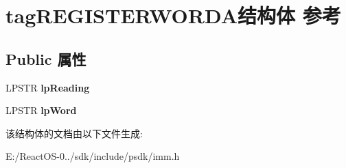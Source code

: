 \hypertarget{structtag_r_e_g_i_s_t_e_r_w_o_r_d_a}{}\section{tag\+R\+E\+G\+I\+S\+T\+E\+R\+W\+O\+R\+D\+A结构体 参考}
\label{structtag_r_e_g_i_s_t_e_r_w_o_r_d_a}
\subsection*{Public 属性}
\begin{DoxyCompactItemize}
\item 
\mbox{\label{structtag_r_e_g_i_s_t_e_r_w_o_r_d_a_a3deb75a1a5e854cf798db72c01b396e6}} 
L\+P\+S\+TR {\bfseries lp\+Reading}
\item 
\mbox{\label{structtag_r_e_g_i_s_t_e_r_w_o_r_d_a_ac11778c9bfec335c7d46fea2f37603f8}} 
L\+P\+S\+TR {\bfseries lp\+Word}
\end{DoxyCompactItemize}


该结构体的文档由以下文件生成\+:\begin{DoxyCompactItemize}
\item 
E\+:/\+React\+O\+S-\/0../sdk/include/psdk/imm.\+h\end{DoxyCompactItemize}
